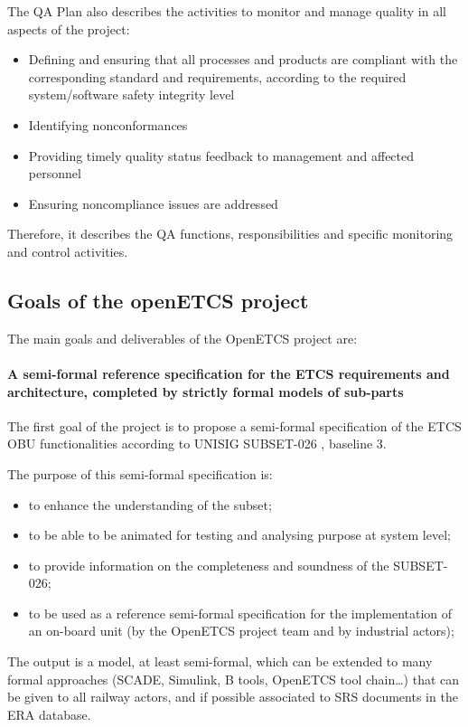 \documentclass{template/openetcs_article}
\begin{document}
The QA Plan also describes the activities to monitor and manage quality in all aspects of the project:

\begin{itemize}
\item Defining and ensuring that all processes and products are compliant with the corresponding standard and requirements, according to the required system/software safety integrity level
\item Identifying nonconformances
\item Providing timely quality status feedback to management and affected personnel
\item Ensuring noncompliance issues are addressed
\end{itemize}

Therefore, it describes the QA functions, responsibilities and specific monitoring and control activities.


\subsection{Goals of the openETCS project}

The main goals and deliverables of the OpenETCS project are:

\paragraph{A semi-formal reference specification for the ETCS requirements and architecture, completed by strictly formal models of sub-parts}
The first goal of the project is to propose a semi-formal specification of the \gls{ETCS} \gls{OBU} functionalities according to UNISIG SUBSET-026 \citep{subset026}, baseline 3.

The purpose of this semi-formal specification is:
\begin{itemize}
\item to enhance the understanding of the subset;
\item to be able to be animated for testing and analysing purpose at system level;
\item to provide information on the completeness and soundness of the SUBSET-026;
\item to be used as a reference semi-formal specification for the implementation of an on-board unit
(by the OpenETCS project team and by industrial actors);
\end{itemize}

The output is a model, at least semi-formal, which can be extended to many formal approaches (SCADE,
Simulink, B tools, OpenETCS tool chain…) that can be given to all railway actors, and
if possible associated to SRS documents in the ERA database.
\end{document}
